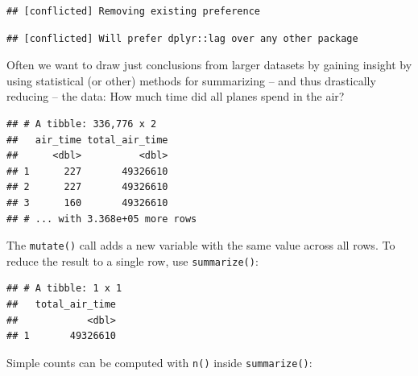 \documentclass[]{book}
\newenvironment{Shaded}{}{}
\newcommand{\DataTypeTok}[1]{#1}
\newcommand{\KeywordTok}[1]{\textcolor[rgb]{0.00,0.00,1.00}{#1}}
\newcommand{\NormalTok}[1]{#1}
\newcommand{\OperatorTok}[1]{#1}
\newcommand{\OtherTok}[1]{\textcolor[rgb]{1.00,0.25,0.00}{#1}}
\newcommand{\StringTok}[1]{\textcolor[rgb]{0.00,0.50,0.50}{#1}}
\begin{document}
\begin{verbatim}
## [conflicted] Removing existing preference
\end{verbatim}

\begin{verbatim}
## [conflicted] Will prefer dplyr::lag over any other package
\end{verbatim}

Often we want to draw just conclusions from larger datasets by gaining insight by using statistical (or other) methods for summarizing -- and thus drastically reducing -- the data:
How much time did all planes spend in the air?

\begin{Shaded}
\end{Shaded}

\begin{verbatim}
## # A tibble: 336,776 x 2
##   air_time total_air_time
##      <dbl>          <dbl>
## 1      227       49326610
## 2      227       49326610
## 3      160       49326610
## # ... with 3.368e+05 more rows
\end{verbatim}

The \texttt{mutate()} call adds a new variable with the same value across all rows.
To reduce the result to a single row, use \texttt{summarize()}:

\begin{Shaded}
\end{Shaded}

\begin{verbatim}
## # A tibble: 1 x 1
##   total_air_time
##            <dbl>
## 1       49326610
\end{verbatim}

Simple counts can be computed with \texttt{n()} inside \texttt{summarize()}:
\end{document}
